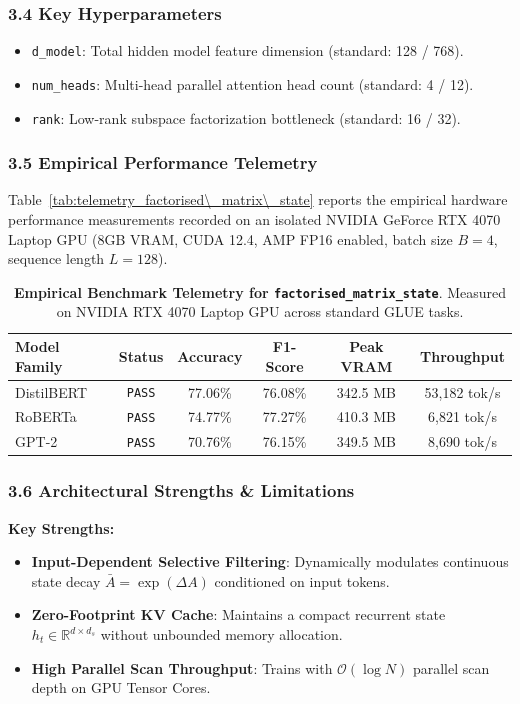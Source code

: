 \subsubsection*{3.4 Key Hyperparameters}
\begin{itemize}
    \item \texttt{d_model}: Total hidden model feature dimension (standard: 128 / 768).
    \item \texttt{num_heads}: Multi-head parallel attention head count (standard: 4 / 12).
    \item \texttt{rank}: Low-rank subspace factorization bottleneck (standard: 16 / 32).
\end{itemize}

\subsubsection*{3.5 Empirical Performance Telemetry}
Table~\ref{tab:telemetry_factorised\_matrix\_state} reports the empirical hardware performance measurements recorded on an isolated NVIDIA GeForce RTX 4070 Laptop GPU (8GB VRAM, CUDA 12.4, AMP FP16 enabled, batch size $B=4$, sequence length $L=128$).

\begin{table}[h]
\centering
\small
\caption{\textbf{Empirical Benchmark Telemetry for \texttt{factorised\_matrix\_state}}. Measured on NVIDIA RTX 4070 Laptop GPU across standard GLUE tasks.}
\label{tab:telemetry_factorised_matrix_state}
\begin{tabular*}{\columnwidth}{@{\extracolsep{\fill}}lccccc}
\toprule
\textbf{Model Family} & \textbf{Status} & \textbf{Accuracy} & \textbf{F1-Score} & \textbf{Peak VRAM} & \textbf{Throughput} \\
\midrule
DistilBERT & \texttt{PASS} & 77.06\% & 76.08\% & 342.5 MB & 53,182 tok/s \\
RoBERTa    & \texttt{PASS} & 74.77\% & 77.27\% & 410.3 MB & 6,821 tok/s \\
GPT-2      & \texttt{PASS} & 70.76\% & 76.15\% & 349.5 MB & 8,690 tok/s \\
\bottomrule
\end{tabular*}
\end{table}

\subsubsection*{3.6 Architectural Strengths \& Limitations}
\textbf{Key Strengths:}
\begin{itemize}
    \item \textbf{Input-Dependent Selective Filtering}: Dynamically modulates continuous state decay $\bar{A} = \exp(\Delta A)$ conditioned on input tokens.
    \item \textbf{Zero-Footprint KV Cache}: Maintains a compact recurrent state $h_t \in \mathbb{R}^{d \times d_s}$ without unbounded memory allocation.
    \item \textbf{High Parallel Scan Throughput}: Trains with $\mathcal{O}(\log N)$ parallel scan depth on GPU Tensor Cores.
\end{itemize}

